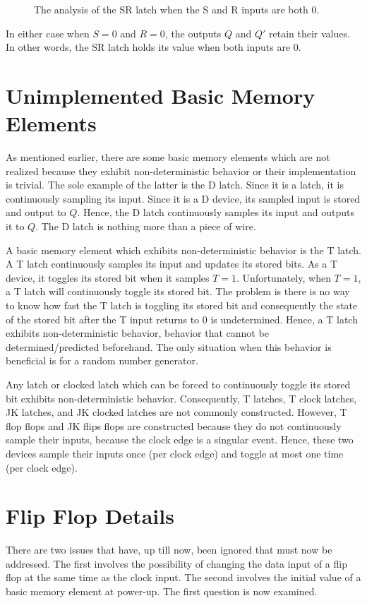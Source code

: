 \begin{figure}[ht]
\center{\texttt{[image: SR1]}}
\caption{The analysis of the SR latch when the S and R
inputs are both 0.}
\label{fig:sequentialCirSRL1}
\end{figure}

In either case when $S=0$ and $R=0$, the outputs $Q$ and $Q'$ retain
their values.  In other words, the SR latch holds its value when
both inputs are 0.

\section{Unimplemented Basic Memory Elements}
As mentioned earlier, there are some basic memory elements
which are not realized because they exhibit non-deterministic
behavior or their implementation is trivial.  The sole example
of the latter is the D latch.  
Since it is a latch, it is continuously sampling its input.  Since it is a
D device, its sampled input is stored and output to $Q$. Hence, the
D latch continuously samples its input and outputs it to $Q$.
The D latch is nothing more than a piece of wire.

A basic memory element which exhibits non-deterministic behavior
is the  T latch.   A T latch continuously samples
its input and updates its stored bits.  As a T device, it toggles
its stored bit when it samples $T=1$.  Unfortunately, when $T=1$,
a T latch will continuously toggle its stored bit. The problem is
there is no way to know how fast the T latch is toggling its stored
bit and consequently the state of the stored bit after the T input
returns to 0 is undetermined.  Hence, a T latch exhibits
non-deterministic behavior, behavior that cannot be
determined/predicted beforehand.  The only situation when this
behavior is beneficial is for a random number generator.

Any latch or clocked latch which can be forced to continuously toggle
its stored bit exhibits non-deterministic behavior.  Consequently,
T latches, T clock latches, JK latches, and JK clocked latches are
not commonly constructed.  However, T flop flops and JK flips flops
are constructed because they do not continuously sample their inputs,
because the clock edge is a singular event.  Hence, these two devices
sample their inputs once (per clock edge) and toggle at most
one time (per clock edge).

\section{Flip Flop Details}
There are two issues that have, up till now, been ignored
that must now be addressed.  The first involves
the possibility of changing the data input of a flip flop at the
same time as the clock input.  The second involves the initial
value of a basic memory element at power-up. The first question
is now examined.

